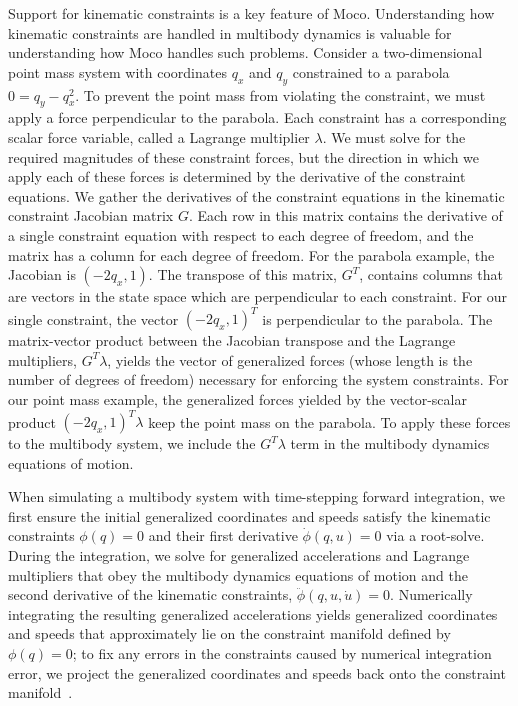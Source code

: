 \documentclass[10pt,letterpaper]{article}
\begin{document}
Support for kinematic constraints is a key feature of Moco. Understanding how kinematic constraints are handled in multibody dynamics is valuable for understanding how Moco handles such problems. Consider a two-dimensional point mass system with coordinates $q_x$ and $q_y$ constrained to a parabola $0 = q_y - q_x^2$. To prevent the point mass from violating the constraint, we must apply a force perpendicular to the parabola. Each constraint has a corresponding scalar force variable, called a Lagrange multiplier $\lambda$. We must solve for the required magnitudes of these constraint forces, but the direction in which we apply each of these forces is determined by the derivative of the constraint equations. We gather the derivatives of the constraint equations in the kinematic constraint Jacobian matrix $G$. Each row in this matrix contains the derivative of a single constraint equation with respect to each degree of freedom, and the matrix has a column for each degree of freedom. For the parabola example, the Jacobian is $( -2q_x, 1)$. The transpose of this matrix, $G^T$, contains columns that are vectors in the state space which are perpendicular to each constraint. For our single constraint, the vector $(-2q_x, 1)^T$ is perpendicular to the parabola. The matrix-vector product between the Jacobian transpose and the Lagrange multipliers, $G^T \lambda$, yields the vector of generalized forces (whose length is the number of degrees of freedom) necessary for enforcing the system constraints. For our point mass example, the generalized forces yielded by the vector-scalar product  $(-2q_x, 1)^T \lambda$ keep the point mass on the parabola. To apply these forces to the multibody system, we include the $G^T \lambda$ term in the multibody dynamics equations of motion.

When simulating a multibody system with time-stepping forward integration, we first ensure the initial generalized coordinates and speeds satisfy the kinematic constraints $\phi(q) = 0$ and their first derivative $\dot{\phi}(q, u) = 0$ via a root-solve. During the integration, we solve for generalized accelerations and Lagrange multipliers that obey the multibody dynamics equations of motion and the second derivative of the kinematic constraints, $\ddot{\phi}(q, u, \dot{u}) = 0$. Numerically integrating the resulting generalized accelerations yields generalized coordinates and speeds that approximately lie on the constraint manifold defined by $\phi(q) = 0$; to fix any errors in the constraints caused by numerical integration error, we project the generalized coordinates and speeds back onto the constraint manifold~\cite{Sherman:2011byc}.
\end{document}
